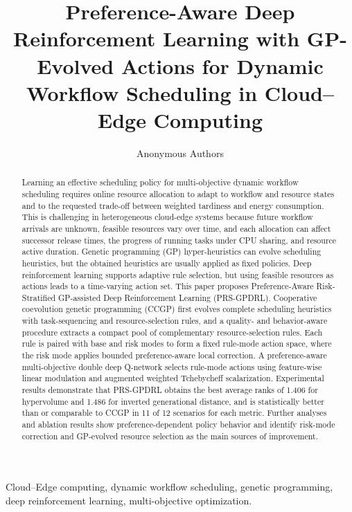 \documentclass[10pt,journal]{IEEEtran}
\begin{document}
\title{Preference-Aware Deep Reinforcement Learning with GP-Evolved Actions for Dynamic Workflow Scheduling in Cloud--Edge Computing}

\author{Anonymous Authors}



\maketitle


\begin{abstract}
Learning an effective scheduling policy for multi-objective dynamic workflow scheduling requires online resource allocation to adapt to workflow and resource states and to the requested trade-off between weighted tardiness and energy consumption. This is challenging in heterogeneous cloud-edge systems because future workflow arrivals are unknown, feasible resources vary over time, and each allocation can affect successor release times, the progress of running tasks under CPU sharing, and resource active duration. Genetic programming (GP) hyper-heuristics can evolve scheduling heuristics, but the obtained heuristics are usually applied as fixed policies. Deep reinforcement learning supports adaptive rule selection, but using feasible resources as actions leads to a time-varying action set. This paper proposes Preference-Aware Risk-Stratified GP-assisted Deep Reinforcement Learning (PRS-GPDRL). Cooperative coevolution genetic programming (CCGP) first evolves complete scheduling heuristics with task-sequencing and resource-selection rules, and a quality- and behavior-aware procedure extracts a compact pool of complementary resource-selection rules. Each rule is paired with base and risk modes to form a fixed rule-mode action space, where the risk mode applies bounded preference-aware local correction. A preference-aware multi-objective double deep Q-network selects rule-mode actions using feature-wise linear modulation and augmented weighted Tchebycheff scalarization. Experimental results demonstrate that PRS-GPDRL obtains the best average ranks of 1.406 for hypervolume and 1.486 for inverted generational distance, and is statistically better than or comparable to CCGP in 11 of 12 scenarios for each metric. Further analyses and ablation results show preference-dependent policy behavior and identify risk-mode correction and GP-evolved resource selection as the main sources of improvement.
\end{abstract}


\begin{IEEEkeywords}
Cloud--Edge computing, dynamic workflow scheduling, genetic programming,
deep reinforcement learning, multi-objective optimization.
\end{IEEEkeywords}
\end{document}
